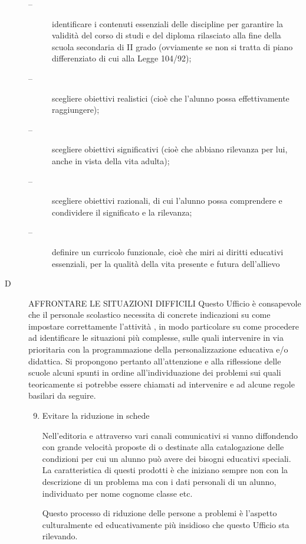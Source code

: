 \begin{description}
	\begin{description}
		\item[--] identificare i contenuti essenziali delle discipline per garantire la validità del corso di studi e
		del diploma rilasciato alla fine della scuola secondaria di II grado (ovviamente se non si tratta
		di piano differenziato di cui alla Legge 104/92);
		\item[--] scegliere obiettivi realistici (cioè che l'alunno possa effettivamente raggiungere);
		\item[--] scegliere obiettivi significativi (cioè che abbiano rilevanza per lui, anche in vista della vita
		adulta);
		\item[--] scegliere obiettivi razionali, di cui l'alunno possa comprendere e condividere il significato e la
		rilevanza;
		\item[--] definire un curricolo funzionale, cioè che miri ai diritti educativi essenziali, per la qualità della
		vita presente e futura dell'allievo
	\end{description}
 \item [D] AFFRONTARE LE SITUAZIONI DIFFICILI
 Questo Ufficio è consapevole che il personale scolastico necessita di concrete indicazioni su come
 impostare correttamente l'attività , in modo particolare su come procedere ad identificare le situazioni
 più complesse, sulle quali intervenire in via prioritaria con la programmazione della personalizzazione
 educativa e/o didattica.
 Si propongono pertanto all'attenzione e alla riflessione delle scuole alcuni spunti in ordine
 all'individuazione dei problemi sui quali teoricamente si potrebbe essere chiamati ad intervenire e ad
 alcune regole basilari da seguire.
 \begin{enumerate}
 	\setcounter{enumi}{8}
 	\item Evitare la riduzione in schede
 	
 	Nell'editoria e attraverso vari canali comunicativi si vanno diffondendo con grande velocità proposte
 	di  o  destinate alla catalogazione delle condizioni per cui un alunno può avere dei
 	bisogni educativi speciali. La caratteristica di questi prodotti è che iniziano sempre non con la
 	descrizione di un problema ma con i dati personali di un alunno, individuato per nome cognome classe
 	etc.
 	
 	Questo processo di riduzione delle persone a problemi è l'aspetto culturalmente ed educativamente
 	più insidioso che questo Ufficio sta rilevando.
 	

\end{enumerate}
\end{description}
